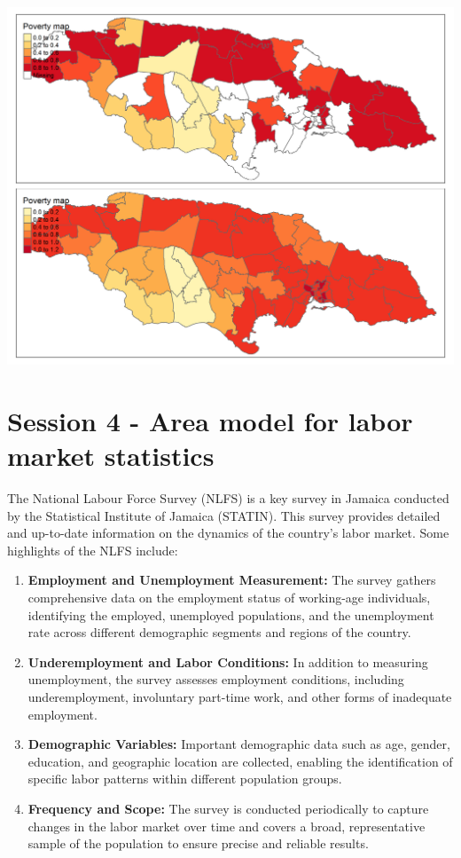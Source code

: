 \documentclass[
  12pt,
]{book}
\begin{document}
\includegraphics{Recursos/04_FH_Arcosin/09_map.png}

\hypertarget{session-4---area-model-for-labor-market-statistics}{%
\chapter{Session 4 - Area model for labor market statistics}\label{session-4---area-model-for-labor-market-statistics}}

The National Labour Force Survey (NLFS) is a key survey in Jamaica conducted by the Statistical Institute of Jamaica (STATIN). This survey provides detailed and up-to-date information on the dynamics of the country's labor market. Some highlights of the NLFS include:

\begin{enumerate}
\def\labelenumi{\arabic{enumi}.}
\item
  \textbf{Employment and Unemployment Measurement:} The survey gathers comprehensive data on the employment status of working-age individuals, identifying the employed, unemployed populations, and the unemployment rate across different demographic segments and regions of the country.
\item
  \textbf{Underemployment and Labor Conditions:} In addition to measuring unemployment, the survey assesses employment conditions, including underemployment, involuntary part-time work, and other forms of inadequate employment.
\item
  \textbf{Demographic Variables:} Important demographic data such as age, gender, education, and geographic location are collected, enabling the identification of specific labor patterns within different population groups.
\item
  \textbf{Frequency and Scope:} The survey is conducted periodically to capture changes in the labor market over time and covers a broad, representative sample of the population to ensure precise and reliable results.
\end{enumerate}
\end{document}

